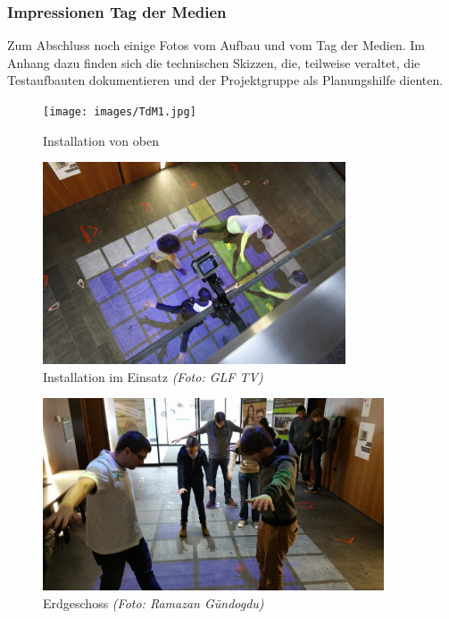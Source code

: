 
\subsubsection{Impressionen Tag der Medien}
Zum Abschluss noch einige Fotos vom Aufbau und vom Tag der Medien. Im Anhang dazu finden sich die technischen Skizzen, die, teilweise veraltet, die Testaufbauten dokumentieren und der Projektgruppe als Planungshilfe dienten.

\begin{figure}[htbp]
	\centering
		\texttt{[image: images/TdM1.jpg]}
	\caption{Installation von oben}
	\label{fig:TdM1}
\end{figure}

\begin{figure}[htbp]
	\centering
		\includegraphics[width=0.8\textwidth]{images/TdM5.jpg}
	\caption{Installation im Einsatz \textit{(Foto: GLF TV)}}
	\label{fig:TdM5}
\end{figure}

\begin{figure}[htbp]
	\centering
		\includegraphics[width=0.9\textwidth]{images/TdM2.jpg}
	\caption{Erdgeschoss \textit{(Foto: Ramazan Gündogdu)}}
	\label{fig:TdM2}
\end{figure}

